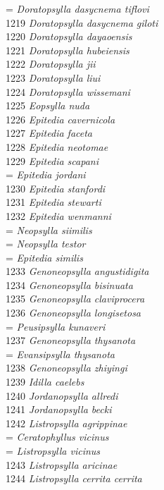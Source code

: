 \documentclass[
]{article}
\begin{document}
= \emph{Doratopsylla dasycnema tiflovi}\\
1219 \emph{Doratopsylla dasycnema giloti}\\
1220 \emph{Doratopsylla dayaoensis}\\
1221 \emph{Doratopsylla hubeiensis}\\
1222 \emph{Doratopsylla jii}\\
1223 \emph{Doratopsylla liui}\\
1224 \emph{Doratopsylla wissemani}\\
1225 \emph{Eopsylla nuda}\\
1226 \emph{Epitedia cavernicola}\\
1227 \emph{Epitedia faceta}\\
1228 \emph{Epitedia neotomae}\\
1229 \emph{Epitedia scapani}\\
= \emph{Epitedia jordani}\\
1230 \emph{Epitedia stanfordi}\\
1231 \emph{Epitedia stewarti}\\
1232 \emph{Epitedia wenmanni}\\
= \emph{Neopsylla siimilis}\\
= \emph{Neopsylla testor}\\
= \emph{Epitedia similis}\\
1233 \emph{Genoneopsylla angustidigita}\\
1234 \emph{Genoneopsylla bisinuata}\\
1235 \emph{Genoneopsylla claviprocera}\\
1236 \emph{Genoneopsylla longisetosa}\\
= \emph{Peusipsylla kunaveri}\\
1237 \emph{Genoneopsylla thysanota}\\
= \emph{Evansipsylla thysanota}\\
1238 \emph{Genoneopsylla zhiyingi}\\
1239 \emph{Idilla caelebs}\\
1240 \emph{Jordanopsylla allredi}\\
1241 \emph{Jordanopsylla becki}\\
1242 \emph{Listropsylla agrippinae}\\
= \emph{Ceratophyllus vicinus}\\
= \emph{Listropsylla vicinus}\\
1243 \emph{Listropsylla aricinae}\\
1244 \emph{Listropsylla cerrita cerrita}\\
\end{document}
